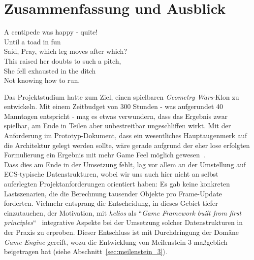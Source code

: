 
\chapter{Zusammenfassung und Ausblick}


\vspace{5mm}
\begin{displayquote}
A centipede was happy - quite!\\
Until a toad in fun\\
Said, Pray, which leg moves after which?\\
This raised her doubts to such a pitch,\\
She fell exhausted in the ditch\\
Not knowing how to run.
\par\hfill\cite{Centipede1870}
\end{displayquote}

\vspace{25mm}



Das Projektstudium hatte zum Ziel, einen spielbaren \textit{Geometry Wars}-Klon zu entwickeln.
Mit einem Zeitbudget von 300 Stunden - was aufgerundet 40 Manntagen entspricht - mag es etwas verwundern, dass das Ergebnis zwar spielbar, am Ende in Teilen aber unbestreitbar ungeschliffen wirkt.
Mit der Anforderung im Prototyp-Dokument, dass ein wesentliches Hauptaugenmerk auf die Architektur gelegt werden sollte, wäre gerade aufgrund der eher lose erfolgten Formulierung ein Ergebnis mit mehr Game Feel möglich gewesen~\cite{juiceitorloseit}.\\

Dass dies am Ende in der Umsetzung fehlt, lag vor allem an der Umstellung auf ECS-typische Datenstrukturen, wobei wir uns auch hier nicht an selbst auferlegten Projektanforderungen orientiert haben: Es gab keine konkreten Lastszenarien, die die Berechnung tausender Objekte pro Frame-Update forderten.
Vielmehr entsprang die Entscheidung, in dieses Gebiet tiefer einzutauchen, der Motivation, mit \textit{helios} als ``\textit{Game Framework built from first principles}``~\cite{HeliosProjectHome} integrative Aspekte bei der Umsetzung solcher Datenstrukturen in der Praxis zu erproben.
Dieser Entschluss ist mit Durchdringung der Domäne \textit{Game Engine} gereift, wozu die Entwicklung von Meilenstein 3 maßgeblich beigetragen hat (siehe Abschnitt~\ref{sec:meilenstein_3}).\\

